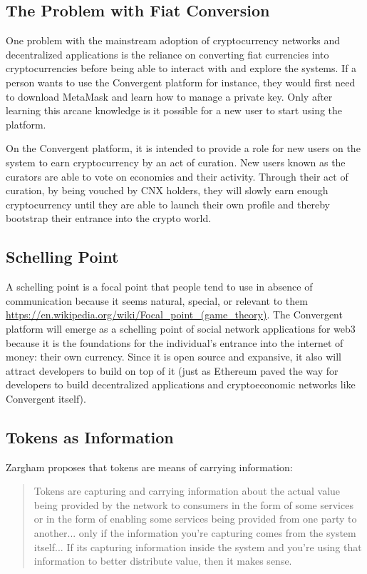 \documentclass[a4paper]{article}
\begin{document}
\subsection{The Problem with Fiat Conversion}

One problem with the mainstream adoption of cryptocurrency networks and decentralized applications is the reliance on converting fiat currencies into cryptocurrencies before being able to interact with and explore the systems. If a person wants to use the Convergent platform for instance, they would first need to download MetaMask and learn how to manage a private key. Only after learning this arcane knowledge is it possible for a new user to start using the platform. 

On the Convergent platform, it is intended to provide a role for new users on the system to earn cryptocurrency by an act of curation. New users known as the curators are able to vote on economies and their activity. Through their act of curation, by being vouched by CNX holders, they will slowly earn enough cryptocurrency until they are able to launch their own profile and thereby bootstrap their entrance into the crypto world.

\subsection{Schelling Point}

A schelling point is a focal point that people tend to use in absence of communication because it seems natural, special, or relevant to them \url{https://en.wikipedia.org/wiki/Focal_point_(game_theory)}. The Convergent platform will emerge as a schelling point of social network applications for web3 because it is the foundations for the individual’s entrance into the internet of money: their own currency. Since it is open source and expansive, it also will attract developers to build on top of it (just as Ethereum paved the way for developers to build decentralized applications and cryptoeconomic networks like Convergent itself).

\subsection{Tokens as Information}

Zargham proposes that tokens are means of carrying information:
\begin{quotation}
Tokens are capturing and carrying information about the actual value being provided by the network to consumers in the form of some services or in the form of enabling some services being provided from one party to another... only if the information you're capturing comes from the system itself... If its capturing information inside the system and you're using that information to better distribute value, then it makes sense.
\end{quotation}
\end{document}
